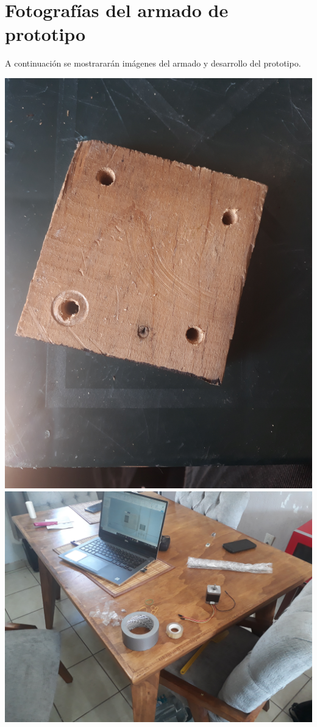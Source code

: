 \documentclass[11pt,a4paper,oldfontcommands,oneside]{memoir}
\begin{document}
\chapter{Fotografías del armado de prototipo}
A continuación se mostrararán imágenes del armado y desarrollo del prototipo.
\begin{center}
\includegraphics[scale=0.05]{1.jpg} \\
\includegraphics[scale=0.05]{2.jpg} \\

\end{center}
\end{document}
